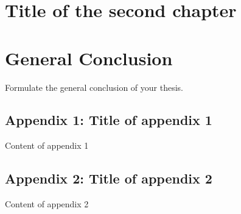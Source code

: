 \documentclass[12pt,a4paper,oneside]{report}
\begin{document}
\clearpage

\chapter{Title of the second chapter}

\clearpage

\chapter*{General Conclusion}

Formulate the general conclusion of your thesis.


\newpage


\clearpage

\listoffigures
{}

\clearpage

\listoftables
{}

\clearpage

\begin{appendices}
    \section*{Appendix 1: Title of appendix 1}

    Content of appendix 1

    \section*{Appendix 2: Title of appendix 2}

    Content of appendix 2
\end{appendices}
\end{document}
